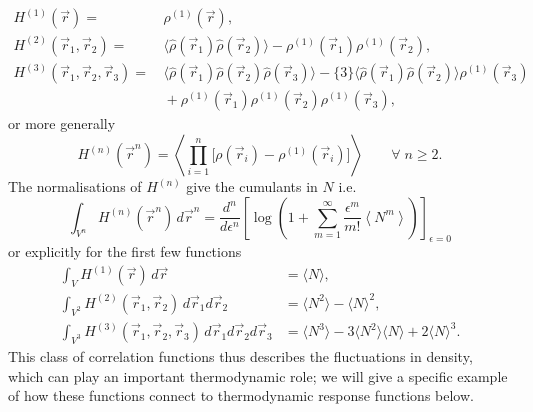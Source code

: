 \begin{subequations}
  \begin{align}
    H^{(1)}(\vec{r})
    =& \,
    \rho^{(1)}(\vec{r}),
    \\
    H^{(2)}(\vec{r}_1, \vec{r}_2)
    =& \,
    \big\langle \hat\rho(\vec{r}_1) \hat\rho(\vec{r}_2) \big\rangle
    - \rho^{(1)}(\vec{r}_1) \rho^{(1)}(\vec{r}_2),
    \label{eq:pair-density-density-correlation}
    \\
    H^{(3)}(\vec{r}_1, \vec{r}_2, \vec{r}_3)
    =& \,
    \big\langle \hat\rho(\vec{r}_1) \hat\rho(\vec{r}_2) \hat\rho(\vec{r}_3) \big\rangle
    - \{3\} \big\langle \hat\rho(\vec{r}_1) \hat\rho(\vec{r}_2) \big\rangle \rho^{(1)}(\vec{r}_3)
    \nonumber \\ & \,
    + \rho^{(1)}(\vec{r}_1) \rho^{(1)}(\vec{r}_2) \rho^{(1)}(\vec{r}_3),
  \end{align}
\end{subequations}
or more generally \cite{Hansen2013}
\begin{equation}\label{eq:density-density-correlations}
  H^{(n)}(\vec{r}^n)
  =
  \left\langle
  \prod_{i=1}^n
  \Big[ \rho(\vec{r}_i) - \rho^{(1)}(\vec{r}_i) \Big]
  \right\rangle
  \qquad \forall \; n \ge 2.
\end{equation}
The normalisations of $H^{(n)}$ give the cumulants in $N$ i.e.\
\begin{equation*}
  \int_{V^n} H^{(n)}(\vec{r}^n) \, d\vec{r}^n
  =
  \frac{d^n}{d\epsilon^n}
  \left[
  \log{\left(
      1 + \sum_{m=1}^\infty
      \frac{\epsilon^m}{m!} \left\langle N^m \right\rangle
      \right)}
  \right]_{\epsilon = 0}
\end{equation*}
or explicitly for the first few functions
\begin{subequations}
  \begin{align}
    \int_V H^{(1)}(\vec{r}) \, d\vec{r}
    &=
    \langle N \rangle,
    \\
    \int_{V^2} H^{(2)}(\vec{r}_1, \vec{r}_2) \, d\vec{r}_1 d\vec{r}_2
    &=
    \langle N^2 \rangle - \langle N \rangle^2,
    \label{eq:pair-density-density-norm}
    \\
    \int_{V^3} H^{(3)}(\vec{r}_1, \vec{r}_2, \vec{r}_3) \, d\vec{r}_1 d\vec{r}_2 d\vec{r}_3
    &=
    \langle N^3 \rangle
    - 3 \langle N^2 \rangle \langle N \rangle
    + 2 \langle N \rangle^3.
  \end{align}
\end{subequations}
This class of correlation functions thus describes the fluctuations in density, which can play an important thermodynamic role; we will give a specific example of how these functions connect to thermodynamic response functions below.

